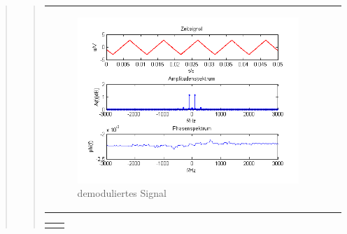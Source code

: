 \begin{quote}
\begin{quote}
\begin{center}
\begin{tabular}{ll}
            \begin{minipage}{0.67\textwidth}
                \begin{figure}[H]
                    \label{fig:DemodreieckmT2}
                    \includegraphics[scale=0.7]{Bilder/Demo_Dre_2k_100Hz_mo_mitTiefpass}
                    \caption{demoduliertes Signal}
                \end{figure}
        
            \end{minipage}
        
        \end{tabular}
        \end{center}
        
        \begin{center}
        \begin{tabular}{ll}
        
        \hspace{-5cm}
            \begin{minipage}{0.67\textwidth}
                

\end{minipage}
\end{tabular}
\end{center}
\end{quote}
\end{quote}
